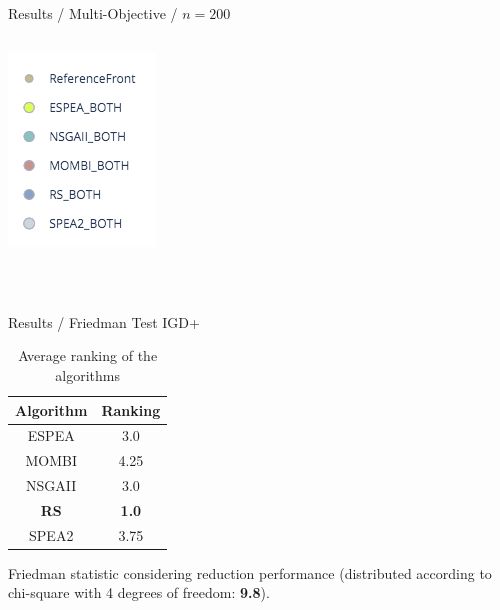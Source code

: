 \documentclass{beamer}
\begin{document}
\begin{frame}{Results / Multi-Objective / $n=200$}
\begin{columns}
\begin{column}{0.30\textwidth}
                    \includegraphics[width=\textwidth]{images/legend_multi.png}
                \end{column}
            \end{columns}\\
    \end{frame}
    
    \begin{frame}{Results / Friedman Test IGD+}
        \begin{table}[!htp]
            \centering
            \caption{Average ranking of the algorithms}
            \begin{tabular}{c|c}
            Algorithm&Ranking\\
            \hline
            ESPEA&3.0\\
            MOMBI&4.25\\
            NSGAII&3.0\\
            \textbf{RS}&\textbf{1.0}\\
            SPEA2&3.75\\
            \end{tabular}
        \end{table}

    Friedman statistic considering reduction performance (distributed according to chi-square with 4 degrees of freedom: \textbf{9.8}).
    \end{frame}
    
\end{document}
